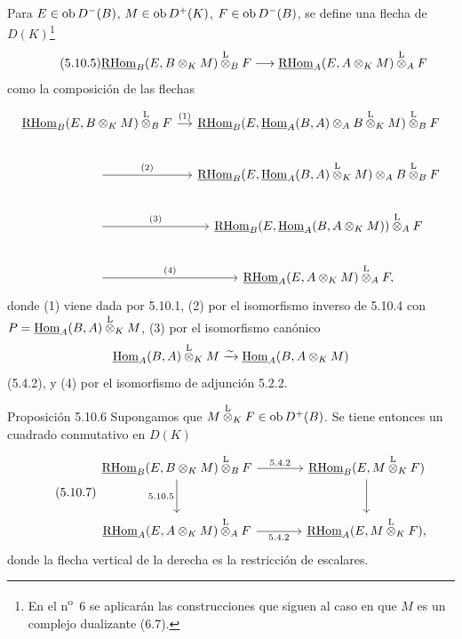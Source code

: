 Para $E\in\operatorname{ob} D^-(B)$, $M\in\operatorname{ob} D^+(K)$, $F\in\operatorname{ob} D^-(B)$, se define una flecha de $D(K)$\footnote{En el n\textsuperscript{o}~6 se aplicarán las construcciones que siguen al caso en que $M$ es un complejo dualizante (6.7).}
\begin{equation}\tag{5.10.5}
\underline{\mathrm{RHom}}_B(E,B\otimes_KM)\overset{\mathrm L}{\otimes}_BF\longrightarrow\underline{\mathrm{RHom}}_A(E,A\otimes_KM)\overset{\mathrm L}{\otimes}_AF
\end{equation}
como la composición de las flechas
\[
\begin{tikzcd}[column sep=small]
\uRHom_B(E,B\otimes_KM)\lten_BF \arrow[r,"(1)"] & \uRHom_B(E,\uHom_A(B,A)\otimes_AB\lten_KM)\lten_BF \\
\arrow[r,"(2)"] & \uRHom_B(E,\uHom_A(B,A)\lten_KM)\otimes_A B\lten_BF \\
\arrow[r,"(3)"] & \uRHom_B(E,\uHom_A(B,A\otimes_KM))\lten_AF \\
\arrow[r,"(4)"] & \uRHom_A(E,A\otimes_KM)\lten_AF,
\end{tikzcd}
\]
donde (1) viene dada por 5.10.1, (2) por el isomorfismo inverso de 5.10.4 con $P=\underline{\operatorname{Hom}}_A(B,A)\overset{\mathrm L}{\otimes}_KM$, (3) por el isomorfismo canónico
\[
\underline{\operatorname{Hom}}_A(B,A)\overset{\mathrm L}{\otimes}_KM\xrightarrow{\sim}\underline{\operatorname{Hom}}_A(B,A\otimes_KM)
\]
(5.4.2), y (4) por el isomorfismo de adjunción 5.2.2.

\begin{statement}{Proposición 5.10.6}
Supongamos que $M\overset{\mathrm L}{\otimes}_KF\in\operatorname{ob} D^+(B)$. Se tiene entonces un cuadrado conmutativo en $D(K)$
\begin{equation}\tag{5.10.7}
\begin{tikzcd}[column sep=large,row sep=large]
\uRHom_B(E,B\otimes_KM)\lten_BF \arrow[r,"5.4.2"] \arrow[d,"5.10.5"'] & \uRHom_B(E,M\lten_KF) \arrow[d]\\
\uRHom_A(E,A\otimes_KM)\lten_AF \arrow[r,"5.4.2"'] & \uRHom_A(E,M\lten_KF),
\end{tikzcd}
\end{equation}
donde la flecha vertical de la derecha es la restricción de escalares.
\end{statement}
